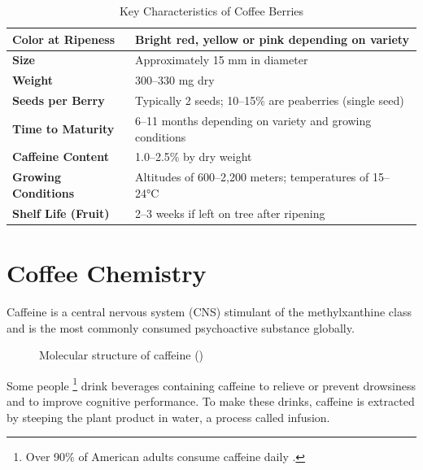 \documentclass{uofithesis}
\begin{document}
\begin{table}
    \centering
    \caption{Key Characteristics of Coffee Berries}
    \medskip
    \label{tab:coffee_characteristics}
    \renewcommand{\arraystretch}{1.5}
    \begin{tabular}{|>{\bfseries}p{2in}|p{4in}|}
        \hline
        Color at Ripeness & Bright red, yellow or pink depending on variety \\
        \hline
        Size & Approximately 15 mm in diameter \\
        \hline
        Weight & 300--330 mg dry \\
        \hline
        Seeds per Berry & Typically 2 seeds; 10--15\% are peaberries (single seed) \\
        \hline
        Time to Maturity & 6--11 months depending on variety and growing conditions \\
        \hline
        Caffeine Content & 1.0--2.5\% by dry weight \\
        \hline
        Growing Conditions & Altitudes of 600--2,200 meters; temperatures of 15--24°C \\
        \hline
        Shelf Life (Fruit) & 2--3 weeks if left on tree after ripening \\
        \hline
    \end{tabular}
\end{table}

\section{Coffee Chemistry}

Caffeine  is a central nervous system (CNS) stimulant of the
methylxanthine class and is the most commonly consumed psychoactive substance
globally.

\begin{figure}
    \centering
    \caption{Molecular structure of caffeine ()}
    \label{fig:caffeine_molecule}
\end{figure}

Some people
\footnote{Over 90\% of American adults consume caffeine daily
\cite{SleepFoundation1}.}
drink beverages containing caffeine to relieve or prevent drowsiness and to
improve cognitive performance. To make these drinks, caffeine is extracted by
steeping the plant product in water, a process called infusion.
\end{document}
